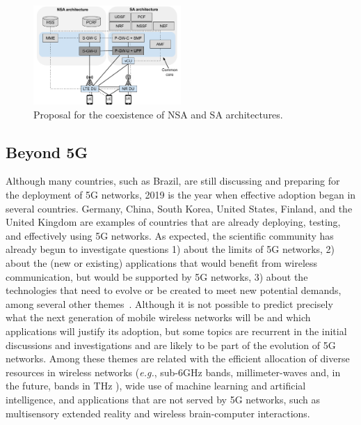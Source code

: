 \begin{figure}[htb]  
  \begin{center}
 \includegraphics[width=0.5\textwidth]{figs/arquitetura_Intermediaria_eng.pdf}
   \end{center}
 \caption{Proposal for the coexistence of NSA and SA architectures.}
 \label{fig:NSAeSA}
\end{figure}


\subsection{Beyond 5G}

Although many countries, such as Brazil, are still discussing and preparing for the deployment of 5G networks, 2019 is the year when effective adoption began in several countries. Germany, China, South Korea, United States, Finland, and the United Kingdom are examples of countries that are already deploying, testing, and effectively using 5G networks. As expected, the scientific community has already begun to investigate questions 1) about the limits of 5G networks, 2) about the (new or existing) applications that would benefit from wireless communication, but would be supported by 5G networks, 3) about the technologies that need to evolve or be created to meet new potential demands, among several other themes~\cite{saad:19, giordani:20}. Although it is not possible to predict precisely what the next generation of mobile wireless networks will be and which applications will justify its adoption, but some topics are recurrent in the initial discussions and investigations and are likely to be part of the evolution of 5G networks. Among these themes are related with the efficient allocation of diverse resources in wireless networks (\textit{e.g.}, sub-6GHz bands, millimeter-waves and, in the future, bands in THz \cite{chen2019survey}), wide use of machine learning and artificial intelligence, and applications that are not served by 5G networks, such as multisensory extended reality and wireless brain-computer interactions.

